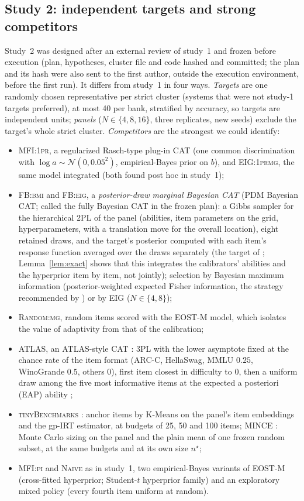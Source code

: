 \subsection{Study 2: independent targets and strong competitors}\label{sec:design2}
Study~2 was designed after an external review of study~1 and frozen before execution
(plan, hypotheses, cluster file and code hashed and committed; the plan and its hash were
also sent to the first author, outside the execution environment, before the first run).
It differs from
study~1 in four ways. \emph{Targets} are one randomly chosen representative per strict
cluster (systems that were not study-1 targets preferred), at most 40 per bank, stratified
by accuracy, so targets are independent units; \emph{panels} ($N\in\{4,8,16\}$, three
replicates, new seeds) exclude the target's whole strict cluster. \emph{Competitors} are
the strongest we could identify:
\begin{itemize}\itemsep0pt
\item \textsc{MFI:1pr}, a regularized Rasch-type plug-in CAT (one common discrimination
with $\log a\sim\mathcal N(0,0.05^2)$, empirical-Bayes prior on $b$), and
\textsc{EIG:1prmg}, the same model integrated (both found post hoc in study~1);
\item \textsc{FB:bmi} and \textsc{FB:eig}, a \emph{posterior-draw marginal Bayesian CAT} (PDM
Bayesian CAT; called the fully Bayesian CAT in the frozen plan): a Gibbs sampler for the
hierarchical 2PL of the panel (abilities, item parameters on the grid, hyperparameters,
with a translation move for the overall location), eight retained draws, and the
target's posterior computed with each item's response function averaged over the draws
separately (the target of \citealp{vanderlinden2020fast}; Lemma~\ref{lem:exact} shows that
this integrates the calibrators' abilities and the hyperprior item by item, not jointly);
selection by Bayesian maximum information
(posterior-weighted expected Fisher information, the strategy recommended by
\citealp{fink2025accounting}) or by EIG ($N\in\{4,8\}$);
\item \textsc{Random:mg}, random items scored with the EOST-M model, which isolates the
value of adaptivity from that of the calibration;
\item \textsc{ATLAS}, an ATLAS-style CAT \citep{li2026atlas}: 3PL with the lower asymptote
fixed at the chance rate of the item format (ARC-C, HellaSwag, MMLU $0.25$, WinoGrande
$0.5$, others 0), first item closest in difficulty to 0, then a uniform draw among the five
most informative items at the expected a posteriori (EAP) ability \citep{kingsbury1989procedures};
\item \textsc{tinyBenchmarks} \citep{polo2024tinybenchmarks}: anchor items by K-Means on
the panel's item embeddings and the gp-IRT estimator, at budgets of 25, 50 and 100 items;
\textsc{MINCE} \citep{das2026mince}: Monte Carlo sizing on the panel and the plain mean of
one frozen random subset, at the same budgets and at its own size $n^\star$;
\item \textsc{MFI:pi} and \textsc{Naive} as in study~1, two empirical-Bayes variants of
EOST-M (cross-fitted hyperprior; Student-$t$ hyperprior family) and an exploratory mixed
policy (every fourth item uniform at random).
\end{itemize}

